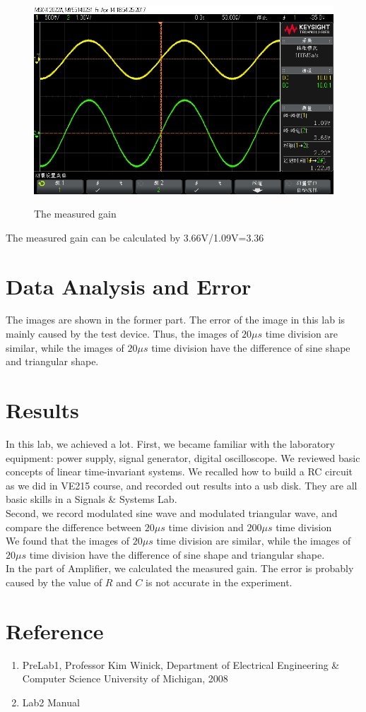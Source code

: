 \documentclass{article}
\begin{document}
\begin{figure}[htbp]
	\centering
		\includegraphics[width=0.7\linewidth]{4.png}
		\label{fig-4}
	\caption{The measured gain}
\end{figure}
 The measured gain can be calculated by 3.66V/1.09V=3.36

\section{Data Analysis and Error}
The images are shown in the former part. The error of the image in this lab is mainly caused by the test device. Thus, the images of $20\mu s$ time division are similar, while the images of $20\mu s$ time division have the difference of sine shape and triangular shape.

\section{Results}
In this lab, we achieved a lot.
First, we became familiar with the laboratory equipment: power supply, signal generator, digital oscilloscope. We reviewed basic concepts of linear time-invariant systems. We recalled how to build a RC circuit as we did in VE215 course, and recorded out results into a usb disk. They are all basic skills in a Signals \& Systems Lab.\\

Second, we record modulated sine wave and modulated triangular wave, and compare the difference between $20\mu s$ time division and $200\mu s$ time division\\

We found that the images of $20\mu s$ time division are similar, while the images of $20\mu s$ time division have the difference of sine shape and triangular shape.\\


In the part of Amplifier, we calculated the measured gain. The error is probably caused by the value of $R$ and $C$ is not accurate in the experiment.


\section{Reference}
\begin{enumerate}
	\item PreLab1, Professor Kim Winick, Department of Electrical Engineering \& Computer Science University of Michigan, 2008
	\item Lab2 Manual
\end{enumerate}
\end{document}
